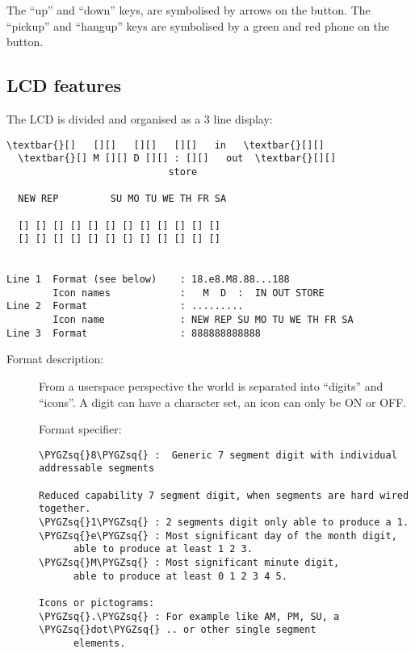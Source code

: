 \documentclass[a4paper,8pt,english]{sphinxmanual}
\def\PYGZsq{\char`\'}
\renewcommand\PYGZsq{\textquotesingle}
\begin{document}
The ``up'' and ``down'' keys, are symbolised by arrows on the button.
The ``pickup'' and ``hangup'' keys are symbolised by a green and red phone
on the button.


\subsection{LCD features}
\label{input/devices/yealink:lcd-features}
The LCD is divided and organised as a 3 line display:

\begin{Verbatim}[commandchars=\\\{\}]
  \textbar{}[]   [][]   [][]   [][]   in   \textbar{}[][]
  \textbar{}[] M [][] D [][] : [][]   out  \textbar{}[][]
                            store

  NEW REP         SU MO TU WE TH FR SA

  [] [] [] [] [] [] [] [] [] [] [] []
  [] [] [] [] [] [] [] [] [] [] [] []


Line 1  Format (see below)    : 18.e8.M8.88...188
        Icon names            :   M  D  :  IN OUT STORE
Line 2  Format                : .........
        Icon name             : NEW REP SU MO TU WE TH FR SA
Line 3  Format                : 888888888888
\end{Verbatim}
\begin{description}
\item[{Format description:}] \leavevmode
From a userspace perspective the world is separated into ``digits'' and ``icons''.
A digit can have a character set, an icon can only be ON or OFF.

Format specifier:

\begin{Verbatim}[commandchars=\\\{\}]
\PYGZsq{}8\PYGZsq{} :  Generic 7 segment digit with individual addressable segments

Reduced capability 7 segment digit, when segments are hard wired together.
\PYGZsq{}1\PYGZsq{} : 2 segments digit only able to produce a 1.
\PYGZsq{}e\PYGZsq{} : Most significant day of the month digit,
      able to produce at least 1 2 3.
\PYGZsq{}M\PYGZsq{} : Most significant minute digit,
      able to produce at least 0 1 2 3 4 5.

Icons or pictograms:
\PYGZsq{}.\PYGZsq{} : For example like AM, PM, SU, a \PYGZsq{}dot\PYGZsq{} .. or other single segment
      elements.
\end{Verbatim}

\end{description}
\end{document}
